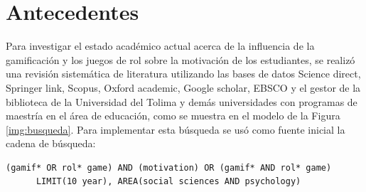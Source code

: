 %
\section{Antecedentes}

Para investigar el estado académico actual acerca de la influencia de la gamificación y los juegos de rol 
sobre la motivación de los estudiantes, se realizó una revisión sistemática de literatura utilizando las bases 
de datos Science direct, Springer link, Scopus, Oxford academic, Google scholar, EBSCO y el gestor de la 
biblioteca de la Universidad del Tolima y demás universidades con programas de maestría en el área de 
educación, como se muestra en el modelo de la Figura \ref{img:busqueda}. Para implementar esta búsqueda se 
usó como fuente inicial la cadena de búsqueda:

\begin{center}\ttfamily{}    %
\begin{minipage}{64\wd0}              %
\begin{verbatim}
(gamif* OR rol* game) AND (motivation) OR (gamif* AND rol* game)
      LIMIT(10 year), AREA(social sciences AND psychology)
\end{verbatim}
\end{minipage}
\end{center}

